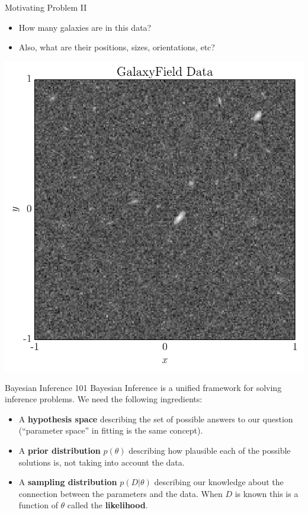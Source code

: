 \begin{frame}[t]{Motivating Problem II}
\begin{itemize}
\item How many galaxies are in this data?
\item Also, what are their positions, sizes, orientations, etc?
\end{itemize}
\begin{center}
\includegraphics[scale=0.35]{../Paper/galaxyfield_data.pdf}
\end{center}
\end{frame}

\begin{frame}[t]{Bayesian Inference 101}
Bayesian Inference is a unified framework for solving inference problems.
We need the following ingredients:

\begin{itemize}
\setlength{\itemsep}{20pt}
\item A {\bf hypothesis space} describing the set of possible answers to our
question (``parameter space'' in fitting is the same concept).
\item A {\bf prior distribution} $p(\theta)$ describing how plausible
each of the possible solutions is, not taking into account the data.
\item A {\bf sampling distribution} $p(D | \theta)$ describing our knowledge
about the connection between the parameters and the data. When $D$ is known
this is a function of $\theta$ called the {\bf likelihood}.
\end{itemize}

\end{frame}


